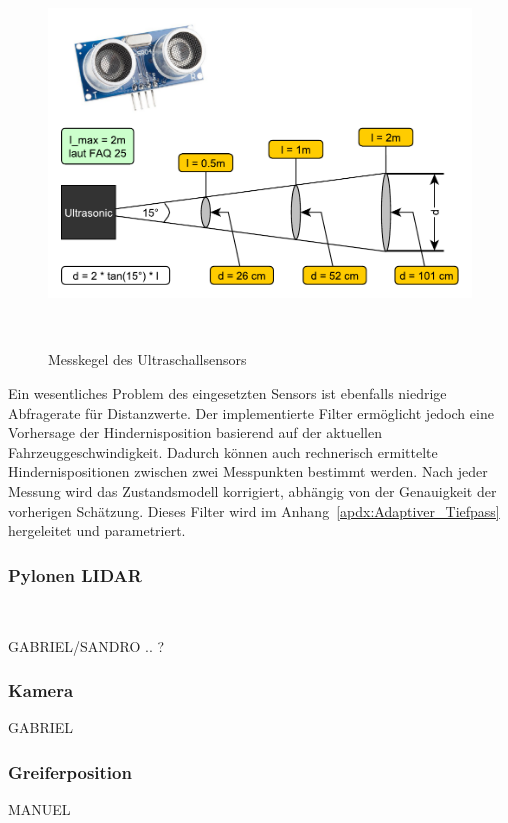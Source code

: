 \documentclass[main.tex]{subfiles} %
\begin{document}
\begin{figure}[H]
    \centering
    \includegraphics[width = 0.5\linewidth]{./fig_Antriebsregelung_Firmware/Auslesegenauigkeit_Ultraschall.pdf}
    \caption{Messkegel des Ultraschallsensors}~\label{fig:HcSr04_Messkegel}
\end{figure}

Ein wesentliches Problem des eingesetzten Sensors ist ebenfalls niedrige
Abfragerate für Distanzwerte. Der implementierte Filter ermöglicht jedoch eine
Vorhersage der Hindernisposition basierend auf der aktuellen
Fahrzeuggeschwindigkeit. Dadurch können auch rechnerisch ermittelte
Hindernispositionen zwischen zwei Messpunkten bestimmt werden. Nach jeder
Messung wird das Zustandsmodell korrigiert, abhängig von der Genauigkeit der
vorherigen Schätzung. Dieses Filter wird im
Anhang~\ref{apdx:Adaptiver_Tiefpass} hergeleitet und parametriert.


\subsubsection*{Pylonen LIDAR}~\label{sec:Sensorik_Lidar}

GABRIEL/SANDRO .. ?

\subsubsection*{Kamera}

GABRIEL

\subsubsection*{Greiferposition}

MANUEL
\end{document}
